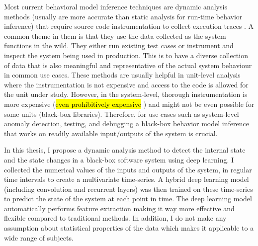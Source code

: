 Most current behavioral model inference techniques are dynamic analysis methods (usually are more accurate than static analysis for run-time behavior inference) that require source code instrumentation to collect execution traces \cite{lo2011mining}. A common theme in them is that they use the data collected as the system functions in the wild. They either run existing test cases or instrument and inspect the system being used in production. 
This is to have a diverse collection of data that is also meaningful and representative of the actual system behaviour in common use cases. 
These methods are usually helpful in unit-level analysis where the instrumentation is not expensive and access to the code is allowed for the unit under study. However, in the system-level, thorough instrumentation is more expensive (\hl{even prohibitively expensive} \cite{mashhadi2019empirical}) and might not be even possible for some units (black-box libraries). Therefore, for use cases such as system-level anomaly detection, testing, and debugging a black-box behavior model inference that works on readily available input/outputs of the system is crucial. 


In this thesis, I propose a dynamic analysis method to detect the internal state and the state changes in a black-box software system using deep learning. I collected the numerical values of the inputs and outputs of the system, in regular time intervals to create a multivariate time-series. A hybrid deep learning model (including convolution and recurrent layers) was then trained on these time-series to predict the state of the system at each point in time. The deep learning model automatically performs feature extraction making it way more effective and flexible compared to traditional methods. In addition, I do not make any assumption about statistical properties of the data which makes it applicable to a wide range of subjects.   


